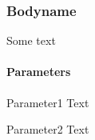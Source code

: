 \subsubsection{Bodyname}
Some text
\paragraph{Parameters}
\begin{description}
 \item{Parameter1} Text
 \item{Parameter2} Text
\end{description}
